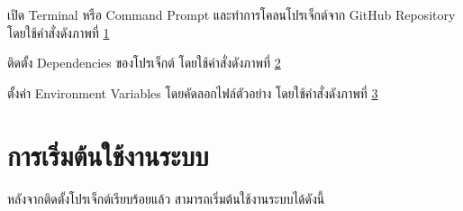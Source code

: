 \begin{mycustomenum2}
    \item เปิด Terminal หรือ Command Prompt และทำการโคลนโปรเจ็กต์จาก GitHub Repository โดยใช้คำสั่งดังภาพที่ \ref{figC:GitClone}

\begin{figure}[htbp]
\centering
{}
\caption{}
\label{figC:GitClone}
\end{figure}

    \item ติดตั้ง Dependencies ของโปรเจ็กต์ โดยใช้คำสั่งดังภาพที่ \ref{figC:BunInstall}

\begin{figure}[htbp]
\centering
{}
\caption{}
\label{figC:BunInstall}
\end{figure}

    \item ตั้งค่า Environment Variables โดยคัดลอกไฟล์ตัวอย่าง โดยใช้คำสั่งดังภาพที่ \ref{figC:EnvSetup}

\begin{figure}[htbp]
\centering
{}
\caption{}
\label{figC:EnvSetup}
\end{figure}
\end{mycustomenum2}

\section{การเริ่มต้นใช้งานระบบ}
\hspace*{1.5em}
หลังจากติดตั้งโปรเจ็กต์เรียบร้อยแล้ว สามารถเริ่มต้นใช้งานระบบได้ดังนี้

